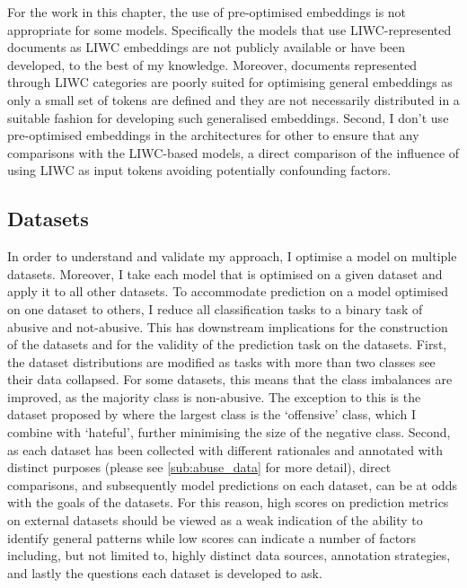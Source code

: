 For the work in this chapter, the use of pre-optimised embeddings is not appropriate for some models.  
Specifically the models that use LIWC-represented documents as LIWC embeddings are not publicly available or have been developed, to the best of my knowledge.  
Moreover, documents represented through LIWC categories are poorly suited for optimising general embeddings as only a small set of tokens are defined and they are not necessarily distributed in a suitable fashion for developing such generalised  embeddings.  
Second, I don't use pre-optimised embeddings in the architectures for other  to ensure that any comparisons with the LIWC-based models,  a direct comparison of the influence of using LIWC as input tokens avoiding potentially confounding factors.  
  
\subsection{Datasets}\label{sub:LIWC_datasets}  
In order to understand and validate my approach, I optimise a model on multiple datasets.  
Moreover, I take each model that is optimised on a given dataset and apply it to all other datasets.  
To accommodate prediction on a model optimised on one dataset to others, I reduce all classification tasks to a binary task of abusive and not-abusive.  
This has downstream implications for the construction of the datasets and for the validity of the prediction task on the  datasets.  
First, the dataset distributions are modified as tasks with more than two classes see their data collapsed.  
For some datasets, this means that the class imbalances are improved, as the majority class is non-abusive.  
The exception to this is the dataset proposed by \citet{Davidson:2017} where the largest class is the `offensive' class, which I combine with `hateful', further minimising the  size of the negative class.  
Second, as each dataset has been collected with different rationales and annotated with distinct purposes (please see \cref{sub:abuse_data} for more detail), direct comparisons, and subsequently model predictions on each dataset, can be at odds with the goals of the datasets.  
For this reason, high scores on prediction metrics on external datasets should be viewed as a weak indication of the ability to identify general patterns while low scores can indicate a number of factors including, but not limited to, highly distinct data sources, annotation strategies, and lastly the questions each dataset is developed to ask.  
  
